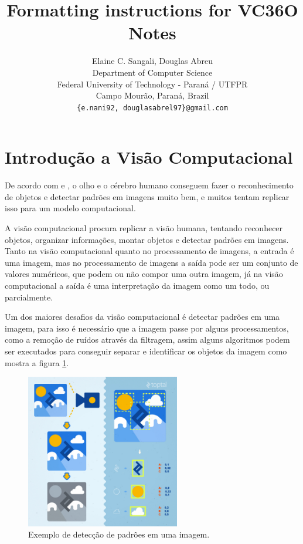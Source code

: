 \documentclass{article}
\title{Formatting instructions for VC36O Notes}
\author{
  Elaine C. Sangali, Douglas Abreu \\
  Department of Computer Science\\
  Federal University of Technology - Paran\'{a} / UTFPR\\
  Campo Mour\~{a}o, Paran\'{a}, Brazil \\
  \texttt{\{e.nani92, douglasabrel97\}@gmail.com} \\
}
\begin{document}
\maketitle

\section{Introdução a Visão Computacional}
    De acordo com  e , o olho e o cérebro humano conseguem fazer o reconhecimento de objetos e detectar padrões em imagens muito bem, e muitos tentam replicar isso para um modelo computacional.
    
    A visão computacional procura replicar a visão humana, tentando reconhecer objetos, organizar informações, montar objetos e detectar padrões em imagens. Tanto na visão computacional quanto no processamento de imagens, a entrada é uma imagem, mas no processamento de imagens a saída pode ser um conjunto de valores numéricos, que podem ou não compor uma outra imagem, já na visão computacional a saída é uma interpretação da imagem como um todo, ou parcialmente.
    
    Um dos maiores desafios da visão computacional é detectar padrões em uma imagem, para isso é necessário que a imagem passe por alguns processamentos, como a remoção de ruídos através da filtragem, assim alguns algoritmos podem ser executados para conseguir separar e identificar os objetos da imagem como mostra a figura \ref{fig:fig1}.
    
     \begin{figure}[H]
        \centering
        \includegraphics[width=0.6\textwidth]{template/img/fig1.jpg}
        \caption{Exemplo de detecção de padrões em uma imagem.}
        \label{fig:fig1}
    \end{figure}
    
\end{document}
